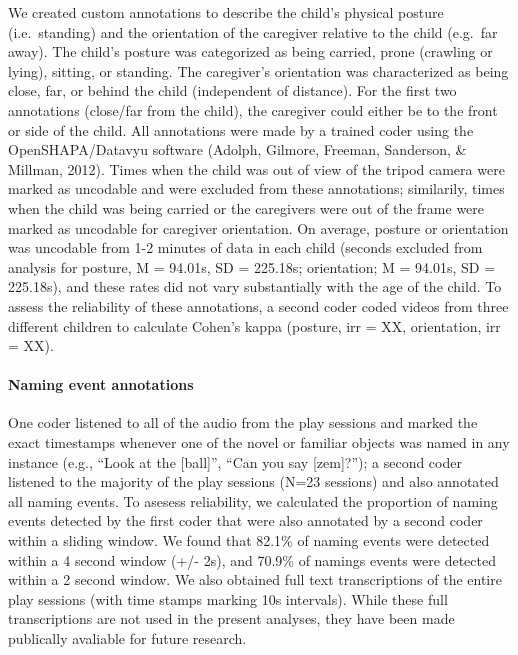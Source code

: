 \documentclass[english,man]{apa6}
\begin{document}
We created custom annotations to describe the child's physical posture
(i.e.~standing) and the orientation of the caregiver relative to the
child (e.g.~far away). The child's posture was categorized as being
carried, prone (crawling or lying), sitting, or standing. The
caregiver's orientation was characterized as being close, far, or behind
the child (independent of distance). For the first two annotations
(close/far from the child), the caregiver could either be to the front
or side of the child. All annotations were made by a trained coder using
the OpenSHAPA/Datavyu software (Adolph, Gilmore, Freeman, Sanderson, \&
Millman, 2012). Times when the child was out of view of the tripod
camera were marked as uncodable and were excluded from these
annotations; similarily, times when the child was being carried or the
caregivers were out of the frame were marked as uncodable for caregiver
orientation. On average, posture or orientation was uncodable from 1-2
minutes of data in each child (seconds excluded from analysis for
posture, M = 94.01s, SD = 225.18s; orientation; M = 94.01s, SD =
225.18s), and these rates did not vary substantially with the age of the
child. To assess the reliability of these annotations, a second coder
coded videos from three different children to calculate Cohen's kappa
(posture, irr = XX, orientation, irr = XX).

\paragraph{Naming event annotations}\label{naming-event-annotations}

One coder listened to all of the audio from the play sessions and marked
the exact timestamps whenever one of the novel or familiar objects was
named in any instance (e.g., \enquote{Look at the {[}ball{]}},
\enquote{Can you say {[}zem{]}?}); a second coder listened to the
majority of the play sessions (N=23 sessions) and also annotated all
naming events. To asesess reliability, we calculated the proportion of
naming events detected by the first coder that were also annotated by a
second coder within a sliding window. We found that 82.1\% of naming
events were detected within a 4 second window (+/- 2s), and 70.9\% of
namings events were detected within a 2 second window. We also obtained
full text transcriptions of the entire play sessions (with time stamps
marking 10s intervals). While these full transcriptions are not used in
the present analyses, they have been made publically avaliable for
future research.
\end{document}
